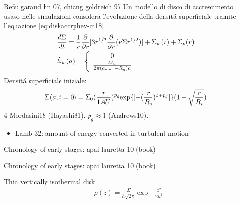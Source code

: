 \begin{workout}
	Refs: garaud lin 07, chiang goldreich 97
	Un modello di disco  di accrescimento usato nelle simulazioni considera l'evoluzione della densit\'a superficiale tramite l'equazione \eqref{eq:diskaccrphev-m18}
	\begin{align}
		&\frac{d \Sigma}{d t}=\frac{1}{r}\frac{\partial}{\partial r}[3r^{1/2}\frac{\partial}{\partial r}(\nu\Sigma r^{1/2})]+\dot{\Sigma}_w(r)+\dot{\Sigma}_p(r)\label{eq:diskaccrphev-m18}\\
		&\dot{\Sigma}_w(a)=\left\{\begin{array}{c}0\\\frac{\dot{M}_w}{2\pi(a_{max}-R_g)a}\\\end{array}\right.
	\end{align}
	Densit\'a superficiale iniziale:
	\begin{equation}
	\Sigma(a,t=0)=\Sigma_0(\frac{r}{1AU})^{p_g}\text{exp}\{[-(\frac{r}{R_o})^{2+p_g}]\}(1-\sqrt{\frac{r}{R_i}})
	\end{equation}
	4-Mordasini18 (Hayashi81). $p_g\approx1$ (Andrews10).
\end{workout}

\begin{workout}
	\begin{itemize}
		\item Lamb 32: amount of energy converted in turbulent motion
	\end{itemize}
\end{workout}

\begin{workout}
	Chronology of  early stages: apai lauretta 10 (book)
\end{workout}

\begin{workout}
	Chronology of  early stages: apai lauretta 10 (book)
\end{workout}

\begin{workout}
	Thin vertically isothermal disk
	\begin{align}
		&\rho(z)=\frac{\Sigma}{h\sqrt{2\pi}}\exp{-\frac{z^2}{2h^2}}\\
		&
	\end{align}
\end{workout}

